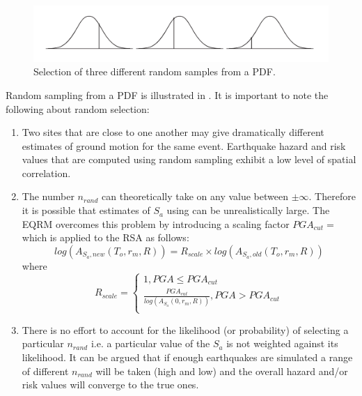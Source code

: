 \begin{figure}
\includegraphics[width=1\textwidth]{diags/fig-hattn-random}
\caption{Selection of three different random samples from a PDF.}
\label{fig:hattn-randomsamp}
\end{figure}
Random sampling from a PDF is illustrated in
. It is important to note the following
about random selection:
\begin{enumerate}
\item Two sites that are close to one another may give
dramatically different estimates of ground motion for the same
event. Earthquake hazard and risk values that are computed using
random sampling exhibit a low level of spatial correlation.
\item
The number $n_{rand}$ can theoretically take on any value between
$\pm \infty$. Therefore it is possible that estimates of $S_a$ using
 can be unrealistically large. The EQRM
overcomes this problem by introducing a scaling factor
$PGA_{cut}=$ which is
applied to the RSA as follows:
\begin{equation}
 log(A_{S_a,new}(T_o,r_m,R)) = R_{scale} \times
log(A_{S_a,old}(T_o,r_m,R))
\end{equation}
where
\begin{equation}\label{rw}
R_{scale}  =
\begin{cases}
1,  PGA \leq PGA_{cut}\\
\frac{PGA_{cut}}{log(A_{S_a}(0,r_m,R))},
PGA > PGA_{cut}\\
\end{cases}
\end{equation}

\item There is no effort to account for the likelihood (or
probability) of selecting a particular $n_{rand}$ i.e. a particular
value of the $S_a$ is not weighted against its likelihood. It can be
argued that if enough earthquakes are simulated a range of different
$n_{rand}$ will be taken (high and low) and the overall hazard
and/or risk values will converge to the true ones.
\end{enumerate}


